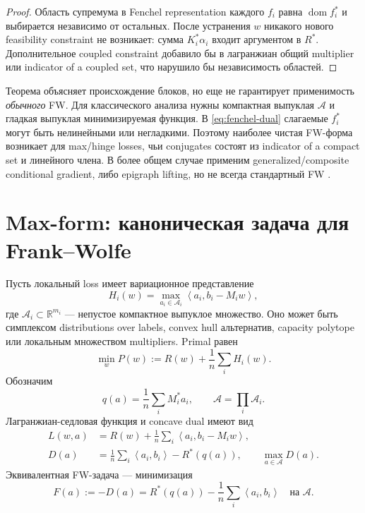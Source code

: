 \documentclass[11pt,a4paper]{article}
\newcommand{\R}{\mathbb{R}}
\newcommand{\A}{\mathcal{A}}
\newcommand{\ip}[2]{\left\langle #1,#2\right\rangle}
\newcommand{\dom}{\operatorname{dom}}
\begin{document}
\begin{proof}
Область супремума в Fenchel representation каждого \(f_i\) равна \(\dom f_i^*\) и выбирается независимо от остальных. После устранения \(w\) никакого нового feasibility constraint не возникает: сумма \(K_i^*\alpha_i\) входит аргументом в \(R^*\). Дополнительное coupled constraint добавило бы в лагранжиан общий multiplier или indicator of a coupled set, что нарушило бы независимость областей.
\end{proof}

Теорема объясняет происхождение блоков, но еще не гарантирует применимость \emph{обычного} FW. Для классического анализа нужны компактная выпуклая \(\A\) и гладкая выпуклая минимизируемая функция. В \eqref{eq:fenchel-dual} слагаемые \(f_i^*\) могут быть нелинейными или негладкими. Поэтому наиболее чистая FW-форма возникает для max/hinge losses, чьи conjugates состоят из indicator of a compact set и линейного члена. В более общем случае применим generalized/composite conditional gradient, либо epigraph lifting, но не всегда стандартный FW \citep{beck2015cyclic}.

\section{Max-form: каноническая задача для Frank--Wolfe}

Пусть локальный loss имеет вариационное представление
\begin{equation}
  \label{eq:max-loss}
  H_i(w)=\max_{a_i\in\A_i}
  \ip{a_i}{b_i-M_iw},
\end{equation}
где \(\A_i\subset\R^{m_i}\) --- непустое компактное выпуклое множество. Оно может быть симплексом distributions over labels, convex hull альтернатив, capacity polytope или локальным множеством multipliers. Primal равен
\begin{equation}
  \label{eq:primal-max}
  \min_w P(w):=R(w)+\frac1n\sum_i H_i(w).
\end{equation}
Обозначим
\[
  q(a)=\frac1n\sum_iM_i^*a_i,
  \qquad \A=\prod_i\A_i.
\]
Лагранжиан-седловая функция и concave dual имеют вид
\begin{align}
  L(w,a)&=R(w)+\frac1n\sum_i\ip{a_i}{b_i-M_iw},\\
  D(a)&=\frac1n\sum_i\ip{a_i}{b_i}-R^*(q(a)),
  \qquad \max_{a\in\A}D(a).
  \label{eq:dual-max}
\end{align}
Эквивалентная FW-задача --- минимизация
\begin{equation}
  \label{eq:F}
  F(a):=-D(a)=R^*(q(a))-\frac1n\sum_i\ip{a_i}{b_i}
  \quad\text{на }\A.
\end{equation}
\end{document}
